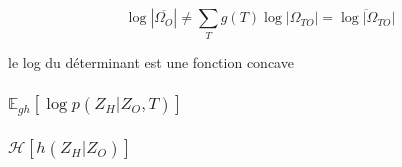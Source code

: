 \documentclass[11pt,a4paper]{article}
\newcommand{\Esp}{\mathds{E}}
\newcommand{\entr}{\mathcal{H}}
\begin{document}
$$ \log |\overline{\Omega_O}| \neq \sum_T g(T) \log |\Omega_{TO}| = \overline{\log |\Omega_{TO}|} $$ 

le log du déterminant est une fonction concave

\subsubsection{$\Esp_{gh}[\log p(Z_H | Z_O,T) ]$}
\subsubsection{$ \entr[h(Z_H|Z_O)]$}
\end{document}
